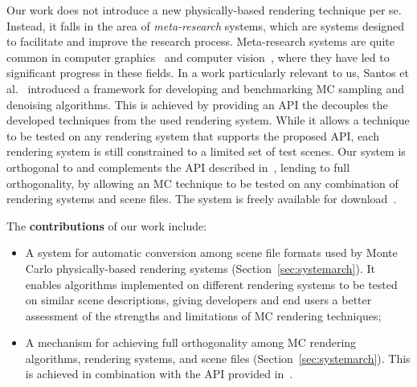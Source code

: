 Our work does not introduce a new physically-based rendering technique per se. Instead, it falls in the area of {\it meta-research} systems, which are systems designed to facilitate and improve the research process. Meta-research systems are quite common in computer graphics~\cite{Santos:2018:FBKSD, Ragan-Kelley2012,Buck2004,Mark2003} and computer vision~\cite{MiddleburyStereo, MiddleburyFlow, AlphaMatting, VideoMatting}, where they have led to significant progress in these fields. In a work particularly relevant to us,  Santos et al.~\cite{Santos:2018:FBKSD} introduced a framework for developing and benchmarking MC sampling and denoising algorithms. This is achieved by providing an API the decouples the developed techniques from the used rendering system. While it allows a technique to be tested on any rendering system that supports the proposed API, each rendering system is still constrained to a limited set of test scenes. Our system is orthogonal to and complements the API described in~\cite{Santos:2018:FBKSD}, lending to full orthogonality, by allowing an MC technique to be tested on any combination of rendering systems and scene files. The system is freely available for download~\cite{sceneConverter}.    

The {\bf contributions} of our work include:
\begin{itemize}
	\item A system for automatic conversion among scene file formats used by Monte Carlo physically-based rendering systems (Section~\ref{sec:systemarch}).
	It enables algorithms implemented on different rendering systems to be tested on similar scene descriptions, giving developers and end users a better assessment of the strengths and limitations of MC rendering techniques;
	\item A mechanism for achieving full orthogonality among MC rendering algorithms, rendering systems, and scene files (Section~\ref{sec:systemarch}). This is achieved in combination with the API provided in~\cite{Santos:2018:FBKSD}. 
\end{itemize}

